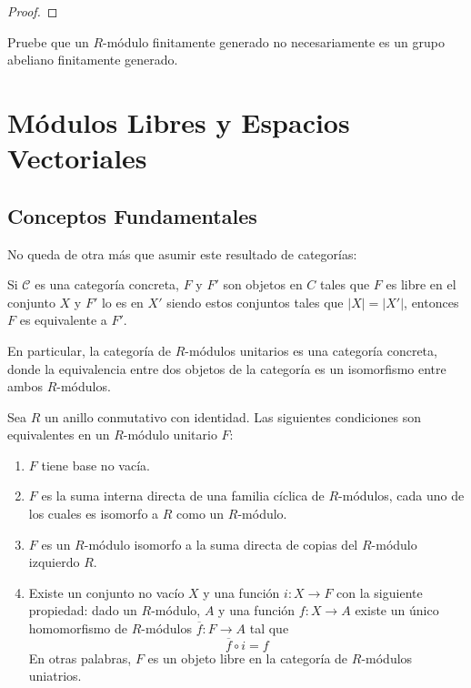 \documentclass[12pt]{report}
\newcounter{it}
\theoremstyle{largebreak}
\newcommand\abs[1]{\ensuremath{\big|#1\big|}}
\newcommand\cf[3]{\ensuremath{#1:#2\rightarrow#3}}
\begin{document}
    \begin{proof}
        
    \end{proof}

    \begin{excer}
        Pruebe que un $R$-módulo finitamente generado no necesariamente es un grupo abeliano finitamente generado.
    \end{excer}

    \newpage

    \chapter{Módulos Libres y Espacios Vectoriales}

    \section{Conceptos Fundamentales}

    No queda de otra más que asumir este resultado de categorías:

    \begin{theor}
        Si $\mathcal{C}$ es una categoría concreta, $F$ y $F'$ son objetos en $C$ tales que $F$ es libre en el conjunto $X$ y $F'$ lo es en $X'$ siendo estos conjuntos tales que $\abs{X}=\abs{X'}$, entonces $F$ es equivalente a $F'$.
    \end{theor}

    En particular, la categoría de $R$-módulos unitarios es una categoría concreta, donde la equivalencia entre dos objetos de la categoría es un isomorfismo entre ambos $R$-módulos.

    \begin{theor}
        Sea $R$ un anillo conmutativo con identidad. Las siguientes condiciones son equivalentes en un $R$-módulo unitario $F$:
        \renewcommand{\theenumi}{\roman{enumi}}
        \begin{enumerate}
            \item $F$ tiene base no vacía.
            \item $F$ es la suma interna directa de una familia cíclica de $R$-módulos, cada uno de los cuales es isomorfo a $R$ como un $R$-módulo.
            \item $F$ es un $R$-módulo isomorfo a la suma directa de copias del $R$-módulo izquierdo $R$.
            \item Existe un conjunto no vacío $X$ y una función $\cf{i}{X}{F}$ con la siguiente propiedad: dado un $R$-módulo, $A$ y una función $\cf{f}{X}{A}$ existe un único homomorfismo de $R$-módulos $\cf{\overline{f}}{F}{A}$ tal que
            \begin{equation*}
                \overline{f}\circ i=f
            \end{equation*}
            En otras palabras, $F$ es un objeto libre en la categoría de $R$-módulos uniatrios.
        \end{enumerate}
    \end{theor}
\end{document}
